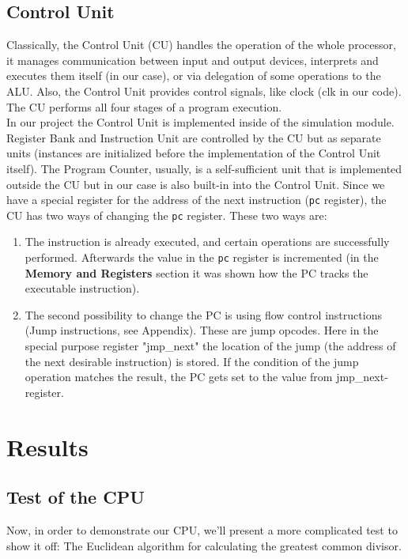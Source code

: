 \documentclass[12pt,a4paper]{scrartcl}
\begin{document}
\subsection{Control Unit}
Classically, the Control Unit (CU) handles the operation of the whole processor, it manages communication between input and output devices, interprets and executes them itself (in our case), or via delegation of some operations to the ALU. Also, the Control Unit provides control signals, like clock (clk in our code). The CU performs all four stages of a program execution.\\
In our project the Control Unit is implemented inside of the simulation module. Register Bank and Instruction Unit are controlled by the CU but as separate units (instances are initialized before the implementation of the Control Unit itself). The Program Counter, usually, is a self-sufficient unit that is implemented outside the CU but in our case is also built-in into the Control Unit. Since we have a special register for the address of the next instruction (\texttt{pc} register), the CU has two ways of changing the \texttt{pc} register. These two ways are:
\begin{enumerate}
	\item The instruction is already executed, and certain operations are successfully performed. Afterwards the value in the \texttt{pc} register is  incremented (in the \textbf{Memory and Registers} section it was shown how the PC tracks the executable instruction). 
	\item The second possibility to change the PC is using flow control instructions (Jump instructions, see Appendix). These are jump opcodes. Here in the special purpose register "jmp\_next" the location of the jump (the address of the next desirable instruction) is stored. If the condition of the jump operation matches the result, the PC gets set to the value from jmp\_next-register.
\end{enumerate}

\newpage
\section{Results}
\subsection{Test of the CPU}
Now, in order to demonstrate our CPU, we'll present a more complicated test to show it off: The Euclidean algorithm for calculating the greatest common divisor.
\end{document}
